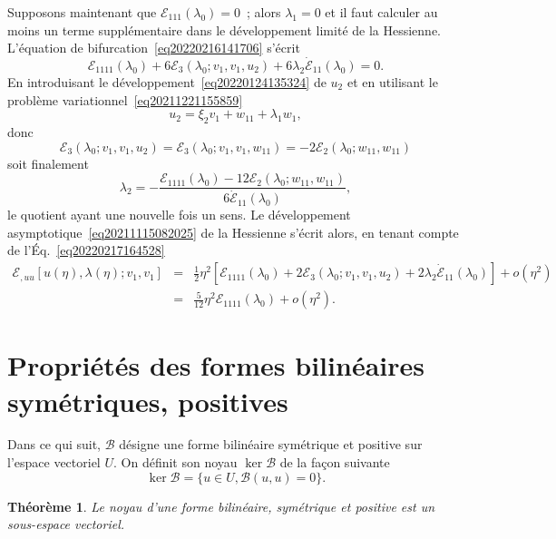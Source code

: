 \documentclass[12pt, final]{amsart}
\newtheorem{theorem}{Théorème}
\begin{document}
Supposons maintenant que $\mathcal{E}_{1  1  1} (\lambda_0) =
0$~; alors $\lambda_1 = 0$ et il faut calculer au moins un terme
suppl{\'e}mentaire dans le d{\'e}veloppement limit{\'e} de la Hessienne.
L'{\'e}quation de bifurcation~\eqref{eq20220216141706} s'{\'e}crit
\begin{equation}
  \label{eq20220217164528} \mathcal{E}_{1  1  1  1}
  (\lambda_0) + 6\mathcal{E}_3 (\lambda_0 ; v_1, v_1, u_2) + 6 \lambda_2
  \dot{\mathcal{E}}_{1  1} (\lambda_0) = 0.
\end{equation}
En introduisant le d{\'e}veloppement~\eqref{eq20220124135324} de $u_2$ et en
utilisant le probl{\`e}me variationnel~\eqref{eq20211221155859}
\begin{equation}
  u_2 = \xi_2 v_1 + w_{1  1} + \lambda_1 w_1,
\end{equation}
donc
\begin{equation}
  \mathcal{E}_3 (\lambda_0 ; v_1, v_1, u_2) =\mathcal{E}_3 (\lambda_0 ; v_1,
  v_1, w_{1  1}) = - 2\mathcal{E}_2 (\lambda_0 ; w_{11}, w_{11})
\end{equation}
soit finalement
\[ \lambda_2 = - \frac{\mathcal{E}_{1  1  1  1}
   (\lambda_0) - 12\mathcal{E}_2 (\lambda_0 ; w_{11}, w_{11})}{6
   \dot{\mathcal{E}}_{1  1} (\lambda_0)}, \]
le quotient ayant une nouvelle fois un sens. Le d{\'e}veloppement
asymptotique~\eqref{eq20211115082025} de la Hessienne s'{\'e}crit alors, en
tenant compte de l'{\'E}q.~\eqref{eq20220217164528}
\begin{eqnarray}
  \mathcal{E}_{, u  u} [u (\eta), \lambda (\eta) ; v_1, v_1] & = &
  \tfrac{1}{2} \eta^2  [\mathcal{E}_{1  1  1  1}
  (\lambda_0) + 2\mathcal{E}_3 (\lambda_0 ; v_1, v_1, u_2) + 2 \lambda_2
  \dot{\mathcal{E}}_{1  1} (\lambda_0)] + o (\eta^2) \nonumber\\
  & = & \tfrac{5}{12} \eta^2 \mathcal{E}_{1  1  1  1}
  (\lambda_0) + o (\eta^2) .
\end{eqnarray}

\section{Propri{\'e}t{\'e}s des formes bilin{\'e}aires sym{\'e}triques,
positives}

Dans ce qui suit, $\mathcal{B}$ d{\'e}signe une forme bilin{\'e}aire
sym{\'e}trique et positive sur l'espace vectoriel $U$. On d{\'e}finit son
noyau $\ker \mathcal{B}$ de la fa{\c c}on suivante
\begin{equation}
  \ker \mathcal{B}= \{u \in U, \mathcal{B}(u, u) = 0\} .
\end{equation}
\begin{theorem}
  Le noyau d'une forme bilin{\'e}aire, sym{\'e}trique et positive est un
  sous-espace vectoriel.
\end{theorem}
\end{document}
